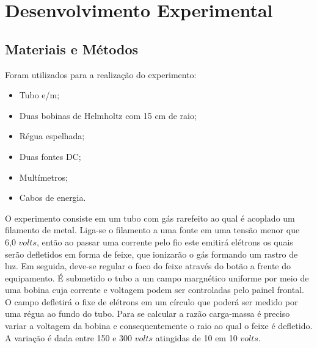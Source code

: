 \section{Desenvolvimento Experimental}
\subsection{Materiais e Métodos}
Foram utilizados para a realização do experimento:
\begin{itemize}
	\item Tubo e/m;
	\item Duas bobinas de Helmholtz com 15 cm de raio;
	\item Régua espelhada;
	\item Duas fontes DC;
	\item Multímetros;
	\item Cabos de energia.
\end{itemize}

O experimento consiste em um tubo com gás rarefeito  ao qual é acoplado um filamento de metal. Liga-se o filamento a uma fonte em uma tensão menor que 6,0 $volts$, então ao passar uma corrente pelo fio este emitirá elétrons os quais serão defletidos em forma de feixe, que ionizarão o gás formando um rastro de luz. Em seguida, deve-se regular o foco do feixe através do botão a frente do equipamento. É submetido o tubo a um campo margnético uniforme por meio de uma bobina cuja corrente e voltagem podem ser controladas pelo painel frontal. O campo defletirá o fixe de elétrons em um círculo que poderá ser medido por uma régua ao fundo do tubo. Para se calcular a razão carga-massa é preciso variar a voltagem da bobina e consequentemente o raio ao qual o feixe é defletido. A variação é dada entre 150 e 300 $volts$ atingidas de 10 em 10 $volts$.

